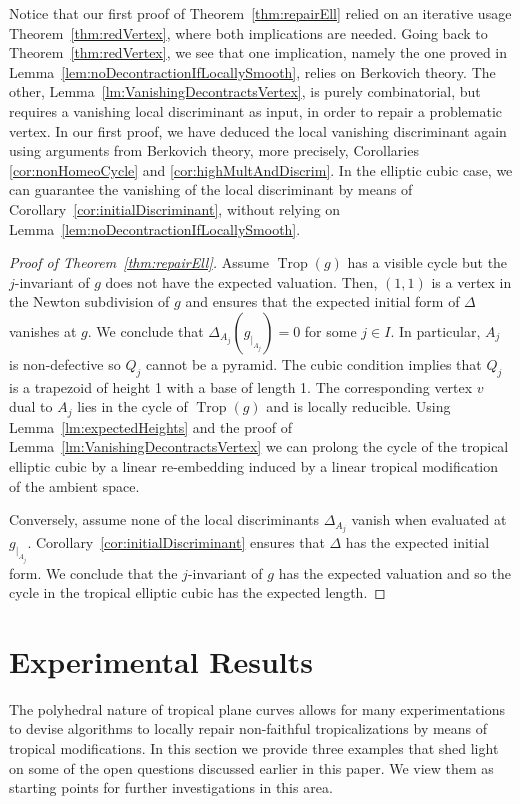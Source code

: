 \documentclass[11pt]{amsart}
\numberwithin{equation}{section}
\theoremstyle{plain}
\theoremstyle{definition}
\theoremstyle{remark}
\begin{document}
 Notice that our first proof of Theorem~\ref{thm:repairEll} relied on
 an iterative usage Theorem~\ref{thm:redVertex}, where both
 implications are needed. Going back to Theorem~\ref{thm:redVertex},
 we see that one implication, namely the one proved in
 Lemma~\ref{lem:noDecontractionIfLocallySmooth}, relies on Berkovich
 theory. The other, Lemma~\ref{lm:VanishingDecontractsVertex}, is
 purely combinatorial, but requires a vanishing local discriminant as
 input, in order to repair a problematic vertex. In our first proof,
 we have deduced the local vanishing discriminant again using
 arguments from Berkovich theory, more precisely, Corollaries
 \ref{cor:nonHomeoCycle} and \ref{cor:highMultAndDiscrim}. In the
 elliptic cubic case, we can guarantee the vanishing of the local
 discriminant by means of Corollary~\ref{cor:initialDiscriminant},
 without relying on Lemma~\ref{lem:noDecontractionIfLocallySmooth}.

\begin{proof}[Proof of Theorem~\ref{thm:repairEll}]
  Assume $\operatorname{Trop}(g)$ has a visible cycle but the $j$-invariant of $g$
  does not have the expected valuation. Then, $(1,1)$ is a vertex in
  the Newton subdivision of $g$ and \cite[Lemma 23]{KMM07} ensures
  that the expected initial form of $\Delta$ vanishes at $g$. We
  conclude that $\Delta_{A_j}(g_{|_{A_j}})=0$ for some $j\in I$. In
  particular, $A_j$ is non-defective so $Q_j$ cannot be a pyramid. The
  cubic condition implies that $Q_j$ is a trapezoid of height 1 with a
  base of length 1. The corresponding vertex $v$ dual to $A_j$ lies in
  the cycle of $\operatorname{Trop}(g)$ and is locally reducible. Using
  Lemma~\ref{lm:expectedHeights} and the proof of
  Lemma~\ref{lm:VanishingDecontractsVertex} we can prolong the cycle
  of the tropical elliptic cubic by a linear re-embedding induced by a
  linear tropical modification of the ambient space.

Conversely, assume none of the local discriminants $\Delta_{A_j}$
vanish when evaluated at $g_{|_{A_j}}$.
Corollary~\ref{cor:initialDiscriminant} ensures that $\Delta$ has the
expected initial form. We conclude that the $j$-invariant of $g$ has
the expected valuation and so the cycle in the tropical elliptic cubic
has the expected length.
\end{proof}
\section{Experimental Results}\label{sec:experiments}
The polyhedral nature of tropical plane curves allows for many
experimentations to devise algorithms to locally repair non-faithful
tropicalizations by means of tropical modifications. In this section we
provide three examples that shed light on some of the open questions
discussed earlier in this paper. We view them as starting points for further
investigations in this area.
\end{document}
